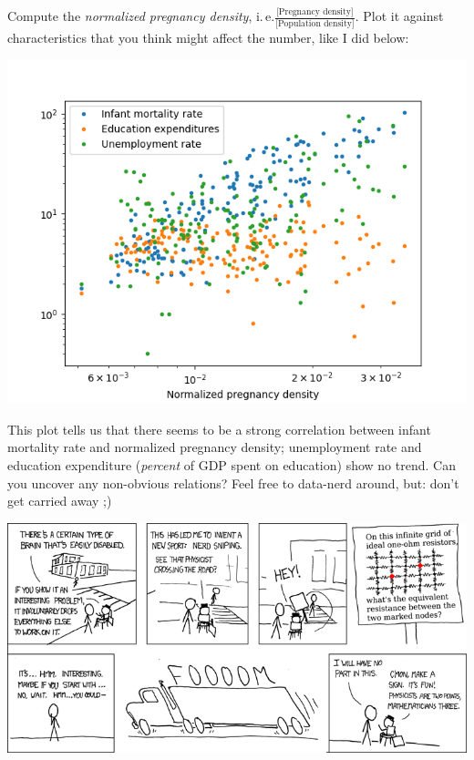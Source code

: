 \documentclass[
	english,
	fontsize=10pt,
	parskip=half,
	titlepage=true,
	DIV=12
]{scrartcl}
\newcommand*{\ie}{i.\,e.\xspace}
\begin{document}
Compute the \emph{normalized pregnancy density}, \ie $\frac{\text{[Pregnancy density]}}{\text{[Population density]}}$. Plot it against characteristics that you think might affect the number, like I did below:
\begin{center}
	\includegraphics[width=.7\linewidth]{./DataAnalysis}
\end{center}
This plot tells us that there seems to be a strong correlation between infant mortality rate and normalized pregnancy density; unemployment rate and education expenditure (\emph{percent} of GDP spent on education) show no trend. Can you uncover any non-obvious relations? Feel free to data-nerd around, but: don't get carried away ;)

\begin{center}
	\includegraphics[width=.9\linewidth]{./xkcd-nerdSniping}
\end{center}
\end{document}
